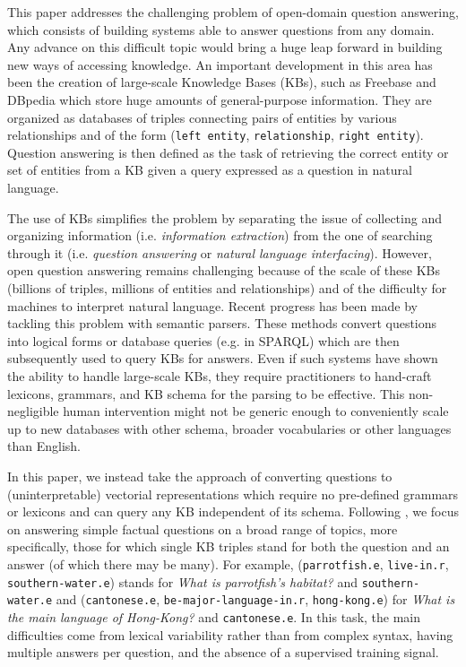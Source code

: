 \documentclass[runningheads,a4paper]{llncs}
\newcommand{\kb}[1]{{\small\texttt{#1}}\xspace}
\newcommand{\dbp}{{\sc DBpedia}\xspace}
\newcommand{\fb}{{\sc Freebase}\xspace}
\begin{document}
This paper addresses the challenging problem of open-domain question answering, which consists of building systems able to answer questions from any domain.
Any advance on this difficult topic would bring a huge leap forward in building new ways of accessing knowledge.
An important development in this area has been the creation of large-scale Knowledge Bases (KBs), such as \fb \cite{bollacker2008freebase} and \dbp \cite{dbpedia-swj} which store huge amounts of general-purpose information.
They are organized as databases of triples connecting pairs of entities by various relationships and of the form (\kb{left entity}, \kb{relationship}, \kb{right entity}). 
Question answering is then defined as the task of retrieving the correct entity or set of entities from a KB given a query expressed as a question in natural language.

The use of KBs simplifies the problem by separating the issue of collecting and organizing information (i.e. {\it information extraction}) from the one of searching through it (i.e. {\it question answering } or {\it natural language interfacing}).
However, open question answering remains challenging because of the scale of these KBs (billions of triples, millions of entities and relationships) and of the difficulty for machines to interpret natural language.
Recent progress \cite{cai-yates:2013:ACL2013,berant-EtAl:2013:EMNLP,kwiatkowski-EtAl:2013:EMNLP,paralex} has been made by tackling this problem with semantic parsers. These methods convert questions into logical forms or database queries (e.g. in SPARQL) which are then subsequently used to query KBs for answers.
Even if such systems have shown the ability to handle large-scale KBs, they require practitioners to hand-craft lexicons, grammars, and KB schema for the parsing to be effective. This non-negligible human intervention might not be generic enough to conveniently scale up to new databases with other schema, broader vocabularies or other languages than English.


In this paper, we instead take the approach of converting questions to (uninterpretable) vectorial representations which require no pre-defined grammars or lexicons and can query any KB independent of its schema.
Following \cite{paralex}, we focus on answering simple factual questions on a broad range of topics, more specifically, those for which single KB triples stand for both the question and an answer (of which there may be many). For example, (\kb{parrotfish.e}, \kb{live-in.r}, \kb{southern-water.e}) stands for {\it What is parrotfish's habitat?} and \kb{southern-water.e} and (\kb{cantonese.e}, \kb{be-major-language-in.r}, \kb{hong-kong.e}) for {\it What is the main language of Hong-Kong?} and \kb{cantonese.e}.
In this task, the main difficulties come from lexical variability rather than from complex syntax, having multiple answers per question, and the absence of a supervised training signal.
\end{document}
